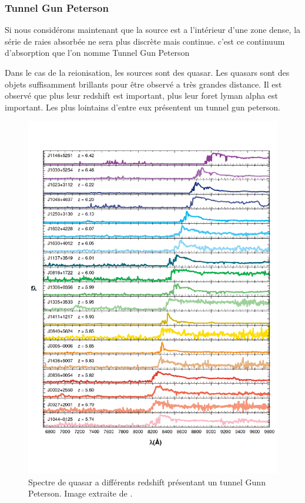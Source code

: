 \subsubsection{Tunnel Gun Peterson}

Si nous considérons maintenant que la source est a l’intérieur d'une zone dense, la série de raies absorbée ne sera plus discrète mais continue.
c'est ce continuum d’absorption que l'on nomme Tunnel Gun Peterson \cite{1965ApJ...141.1295S}


Dans le cas de la reionisation, les sources sont des quasar.
Les quasars sont des objets suffisamment brillants pour être observé a très grandes distance.
Il est observé que plus leur redshift est important, plus leur foret lyman alpha est important.
Les plus lointains d'entre eux présentent  un tunnel gun peterson.


\begin{figure}[bth]
        \includegraphics[width=.95\linewidth]{img/01/quasar_spectre.pdf} 
        \caption{Spectre de quasar a différents redshift présentant un tunnel Gunn Peterson.
		Image extraite de \cite{fan_constraining_2006}.}
 		\label{fig:spectre_quasar}
\end{figure}

